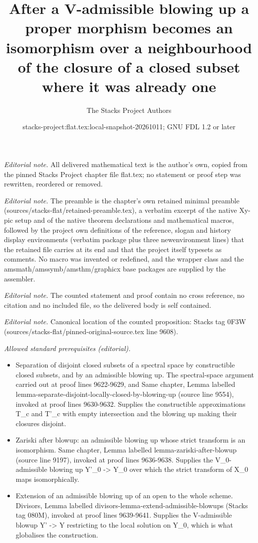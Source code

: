 \documentclass[10pt,a4paper]{amsart}
\title{After a V-admissible blowing up a proper morphism becomes an isomorphism over a neighbourhood of the closure of a closed subset where it was already one}
\author{The Stacks Project Authors}
\date{stacks-project:flat.tex:local-snapshot-20261011; GNU FDL 1.2 or later}
\theoremstyle{plain}
\theoremstyle{definition}
\theoremstyle{remark}
\numberwithin{equation}{subsection}
\begin{document}
\maketitle
\noindent\textit{Editorial note.} All delivered mathematical text is the author's own, copied from the pinned Stacks Project chapter file flat.tex; no statement or proof step was rewritten, reordered or removed.\par\medskip
\noindent\textit{Editorial note.} The preamble is the chapter's own retained minimal preamble (sources/stacks-flat/retained-preamble.tex), a verbatim excerpt of the native Xy-pic setup and of the native theorem declarations and mathematical macros, followed by the project own definitions of the reference, slogan and history display environments (verbatim package plus three newenvironment lines) that the retained file carries at its end and that the project itself typesets as comments. No macro was invented or redefined, and the wrapper class and the amsmath/amssymb/amsthm/graphicx base packages are supplied by the assembler.\par\medskip
\noindent\textit{Editorial note.} The counted statement and proof contain no cross reference, no citation and no included file, so the delivered body is self contained.\par\medskip
\noindent\textit{Editorial note.} Canonical location of the counted proposition: Stacks tag 0F3W (sources/stacks-flat/pinned-original-source.tex line 9608).\par\medskip
\noindent\textit{Allowed standard prerequisites (editorial).}\begin{itemize}
\item Separation of disjoint closed subsets of a spectral space by constructible closed subsets, and by an admissible blowing up. The spectral-space argument carried out at proof lines 9622-9629, and Same chapter, Lemma labelled lemma-separate-disjoint-locally-closed-by-blowing-up (source line 9554), invoked at proof lines 9630-9632. Supplies the constructible approximations T\_c and T'\_c with empty intersection and the blowing up making their closures disjoint.
\item Zariski after blowup: an admissible blowing up whose strict transform is an isomorphism. Same chapter, Lemma labelled lemma-zariski-after-blowup (source line 9197), invoked at proof lines 9636-9638. Supplies the V\_0-admissible blowing up Y'\_0 -> Y\_0 over which the strict transform of X\_0 maps isomorphically.
\item Extension of an admissible blowing up of an open to the whole scheme. Divisors, Lemma labelled divisors-lemma-extend-admissible-blowups (Stacks tag 080M), invoked at proof lines 9639-9641. Supplies the V-admissible blowup Y' -> Y restricting to the local solution on Y\_0, which is what globalises the construction.
\end{itemize}\medskip
\end{document}
